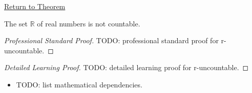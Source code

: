 \newpage
{}
\label{prf:r-uncountable}

\begin{remark*}[Return]
\hyperref[thm:R-uncountable]{Return to Theorem}
\end{remark*}


\begin{theorem*}
The set $\mathbb{R}$ of real numbers is not countable.
\end{theorem*}

\begin{proof}[Professional Standard Proof]
\LRAProofBodyStart
TODO: professional standard proof for r-uncountable.
\end{proof}

\begin{proof}[Detailed Learning Proof]
\LRAProofBodyStart
TODO: detailed learning proof for r-uncountable.
\end{proof}

\begin{remark*}
\end{remark*}

\begin{dependencies}
\begin{itemize}
  \item TODO: list mathematical dependencies.
\end{itemize}
\end{dependencies}

\clearpage
